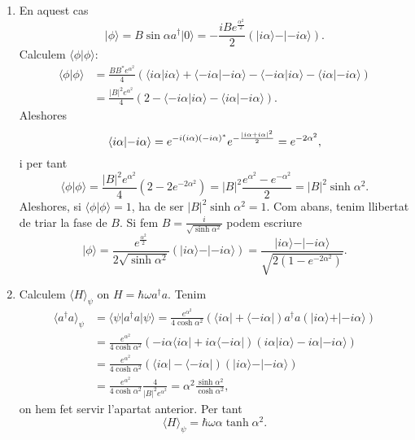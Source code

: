 \documentclass[12pt]{article}
\numberwithin{table}{section}
\numberwithin{figure}{section}
\numberwithin{equation}{section}
\let\Im\relax
\DeclareMathOperator{\Im}{Im}
\newcommand{\abs}[1]{\lvert #1 \rvert}
\newcommand{\ket}[1]{\vert {#1} \rangle}
\newcommand{\bra}[1]{\langle #1 \vert}
\newcommand{\braket}[2]{\langle {#1} \vert {#2} \rangle}
\begin{document}
\begin{enumerate}[label=(\alph*), font=\bfseries \sffamily, wide, labelwidth=!, labelindent=0pt]
\item En aquest cas
	\begin{equation*}
		\ket{\phi} = B \sin{\alpha a^\dagger} \ket{0} = -\frac{iB e^{\frac{\alpha^2}{2}}}{2}(\ket{i \alpha} - \ket{-i \alpha}). 
	\end{equation*}
	Calculem \( \braket{\phi}{\phi} \):
	\begin{align*}
		\braket{\phi}{\phi} & = \frac{BB^\ast e^{\alpha^2}}{4}(\braket{i\alpha}{i\alpha} + \braket{-i\alpha}{-i\alpha} - \braket{-i\alpha}{i\alpha} - \braket{i\alpha}{-i\alpha}) \\
												& = \frac{\abs{B}^2 e^{\alpha^2}}{4}(2 - \braket{-i\alpha}{i\alpha} - \braket{i\alpha}{-i\alpha}).
	\end{align*}
Aleshores
\begin{equation*}
	\braket{i\alpha}{-i\alpha} = e^{-i \Im{(i\alpha)(-i\alpha)^\ast}} e^{-\frac{\abs{i\alpha + i\alpha}^2}{2}} = e^{-2\alpha^2},
\end{equation*}
i per tant
\begin{equation*}
	\braket{\phi}{\phi} = \frac{\abs{B}^2 e^{\alpha^2}}{4}(2 - 2e^{-2\alpha^2}) = \abs{B}^2 \frac{e^{\alpha^2} - e^{-\alpha^2}}{2} = \abs{B}^2 \sinh{\alpha^2}.
\end{equation*}
Aleshores, si \( \braket{\phi}{\phi} = 1 \), ha de ser \( \abs{B}^2 \sinh{\alpha^2} = 1 \). Com abans, tenim llibertat de triar la fase de \( B \). Si fem \( B = \frac{i}{\sqrt{\sinh{\alpha^2}}} \) podem escriure
\begin{equation*}
	\ket{\phi} = \frac{e^{\frac{\alpha^2}{2}}}{2\sqrt{\sinh{\alpha^2}}}(\ket{i \alpha} - \ket{-i \alpha}) = \frac{\ket{i \alpha} - \ket{-i \alpha}}{\sqrt{2(1 - e^{-2\alpha^2})}}.
\end{equation*}

\item Calculem \( \langle H \rangle_\psi \) on \( H = \hbar \omega a^\dagger a \). Tenim
	\begin{align*}
		\langle a^\dagger a \rangle_\psi & = \bra{\psi} a^\dagger a	\ket{\psi} = \frac{e^{\alpha^2}}{4\cosh{\alpha^2}} (\bra{i\alpha} + \bra{-i\alpha})a^\dagger a(\ket{i\alpha} + \ket{-i\alpha}) \\
																		 & = \frac{e^{\alpha^2}}{4\cosh{\alpha^2}} (-i\alpha\bra{i\alpha} + i\alpha\bra{-i\alpha})(i\alpha\ket{i\alpha} - i\alpha\ket{-i\alpha}) \\
																		 & = \frac{e^{\alpha^2}}{4\cosh{\alpha^2}} (\bra{i\alpha} - \bra{-i\alpha})(\ket{i\alpha} - \ket{-i\alpha}) \\
																		 & = \frac{e^{\alpha^2}}{4\cosh{\alpha^2}} \frac{4}{\abs{B}^2 e^{\alpha^2}} = \alpha^2 \frac{\sinh{\alpha^2}}{\cosh{\alpha^2}},
	\end{align*}
on hem fet servir l'apartat anterior. Per tant 
\begin{equation*}
\langle H \rangle_\psi = \hbar\omega\alpha \tanh{\alpha^2}.
\end{equation*}


\end{enumerate}
\end{document}
